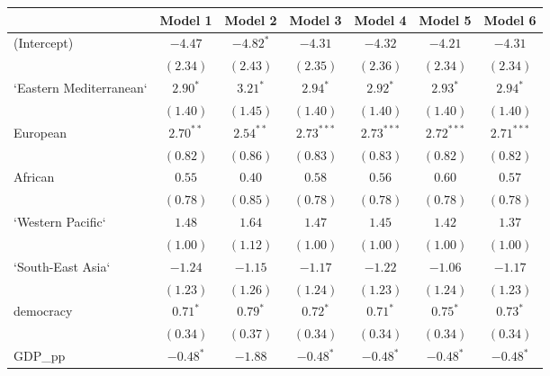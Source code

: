 
\begin{table}[!h]
\begin{center}
\begin{tabular}{l c c c c c c }
\toprule
 & Model 1 & Model 2 & Model 3 & Model 4 & Model 5 & Model 6 \\
\midrule
(Intercept)             & $-4.47$      & $-4.82^{*}$  & $-4.31$      & $-4.32$      & $-4.21$      & $-4.31$      \\
                        & $(2.34)$     & $(2.43)$     & $(2.35)$     & $(2.36)$     & $(2.34)$     & $(2.34)$     \\
`Eastern Mediterranean` & $2.90^{*}$   & $3.21^{*}$   & $2.94^{*}$   & $2.92^{*}$   & $2.93^{*}$   & $2.94^{*}$   \\
                        & $(1.40)$     & $(1.45)$     & $(1.40)$     & $(1.40)$     & $(1.40)$     & $(1.40)$     \\
European                & $2.70^{**}$  & $2.54^{**}$  & $2.73^{***}$ & $2.73^{***}$ & $2.72^{***}$ & $2.71^{***}$ \\
                        & $(0.82)$     & $(0.86)$     & $(0.83)$     & $(0.83)$     & $(0.82)$     & $(0.82)$     \\
African                 & $0.55$       & $0.40$       & $0.58$       & $0.56$       & $0.60$       & $0.57$       \\
                        & $(0.78)$     & $(0.85)$     & $(0.78)$     & $(0.78)$     & $(0.78)$     & $(0.78)$     \\
`Western Pacific`       & $1.48$       & $1.64$       & $1.47$       & $1.45$       & $1.42$       & $1.37$       \\
                        & $(1.00)$     & $(1.12)$     & $(1.00)$     & $(1.00)$     & $(1.00)$     & $(1.00)$     \\
`South-East Asia`       & $-1.24$      & $-1.15$      & $-1.17$      & $-1.22$      & $-1.06$      & $-1.17$      \\
                        & $(1.23)$     & $(1.26)$     & $(1.24)$     & $(1.23)$     & $(1.24)$     & $(1.23)$     \\
democracy               & $0.71^{*}$   & $0.79^{*}$   & $0.72^{*}$   & $0.71^{*}$   & $0.75^{*}$   & $0.73^{*}$   \\
                        & $(0.34)$     & $(0.37)$     & $(0.34)$     & $(0.34)$     & $(0.34)$     & $(0.34)$     \\
GDP\_pp                 & $-0.48^{*}$  & $-1.88$      & $-0.48^{*}$  & $-0.48^{*}$  & $-0.48^{*}$  & $-0.48^{*}$  \\

\end{tabular}
\end{center}
\end{table}
